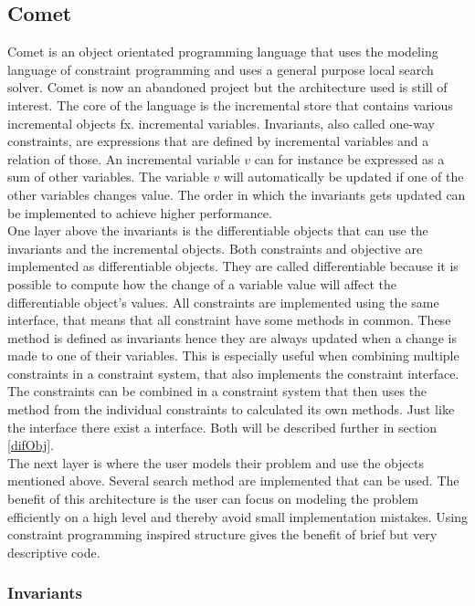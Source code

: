 

\subsection{Comet}
Comet is an object orientated programming language that uses the modeling language of constraint programming and uses a 
general purpose local search solver. Comet is now an abandoned project but the architecture used is still of interest. 
The core of the language is the incremental store that contains various incremental objects fx. incremental variables. 
Invariants, also called one-way constraints, are expressions that are defined by incremental variables and a relation of 
those. An incremental variable $v$ can for instance be expressed as a sum of other variables. The variable $v$ will 
automatically be updated if one of the other variables changes value. The order in which the invariants gets updated can 
be implemented to achieve higher performance. \\ \medskip
One layer above the invariants is the differentiable objects that can use the invariants and the incremental objects. 
Both constraints and objective are implemented as differentiable objects. They are called differentiable 
because it is possible to compute how the change of a variable value will affect the differentiable object's values. 
All 
constraints are implemented using the same interface, that means that all constraint have some methods in common. These 
method is defined as invariants hence they are always updated when a change is made to one of their variables. This is 
especially useful when combining multiple constraints in a constraint system, that also implements the constraint 
interface. The constraints can be combined in a constraint system that then uses the method from the individual 
constraints to calculated its own methods. Just like the  interface there exist a 
 interface. Both 
will be described further in section \ref{difObj}. \\ \medskip
The next layer is where the user models their problem and use the objects mentioned above. Several search method are 
implemented that can be used. The benefit of this architecture is the user can focus on modeling the problem 
efficiently on a high level and thereby avoid small implementation mistakes. Using constraint programming inspired 
structure gives the benefit of brief but very descriptive code.

\subsubsection{Invariants}



